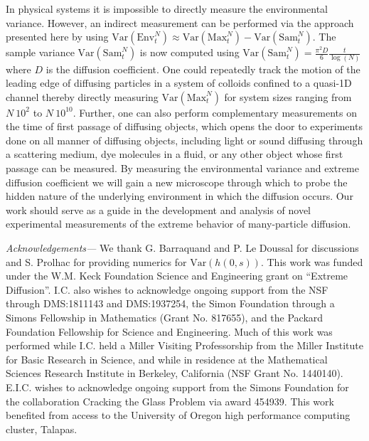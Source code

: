 \documentclass[%
 reprint,
 amsmath,amssymb,
 longbibliography,
 aps,
prl
]{revtex4-1}
\newcommand{\var}[1]{\mathrm{Var}\left(#1\right)}
\def\maxnt{\mathrm{Max}^{N}_t}
\def\envnt{\mathrm{Env}^{N}_t}
\def\snt{\mathrm{Sam}^{N}_t}
\begin{document}
In physical systems it is impossible to directly measure the environmental variance. However, an indirect measurement can be performed via the approach presented here by using $\var \envnt\approx \var \maxnt - \var \snt$. The sample variance $\var \snt$ is now computed using
$
 \var \snt = \frac{\pi^2 D}{6} \frac{t}{\log(N)}
$
where $D$ is the diffusion coefficient. One could repeatedly track the motion of the leading edge of diffusing particles in a system of colloids confined to a quasi-1D channel thereby directly measuring $\var \maxnt$ for system sizes ranging from $N ~ 10^2$ to $N ~ 10^{10}$. Further, one can also perform complementary measurements on the time of first passage of diffusing objects, which opens the door to experiments done on all manner of diffusing objects, including light or sound diffusing through a scattering medium, dye molecules in a fluid, or any other object whose first passage can be measured.
By measuring the environmental variance and extreme diffusion coefficient we will gain a new microscope through which to probe the hidden nature of the underlying environment in which the diffusion occurs. Our work should serve as a guide in the development and analysis of novel experimental measurements of the extreme behavior of many-particle diffusion.

\medskip\noindent\emph{Acknowledgements---}
We thank G. Barraquand and P. Le Doussal for discussions and S. Prolhac for providing numerics for $\var{h(0,s)}$.
This work was funded under the W.M. Keck Foundation Science and Engineering grant on ``Extreme Diffusion''.
I.C. also wishes to acknowledge ongoing support from the NSF through DMS:1811143 and DMS:1937254, the Simon Foundation through a Simons Fellowship in Mathematics (Grant No. 817655), and the Packard Foundation Fellowship for Science and Engineering. Much of this work was performed while I.C. held a Miller Visiting Professorship from the Miller Institute for Basic Research in Science, and while in residence at the Mathematical Sciences Research Institute in Berkeley, California (NSF Grant No. 1440140).
E.I.C. wishes to acknowledge ongoing support from the Simons Foundation for the collaboration Cracking the Glass Problem via award 454939. This work benefited from access to the University of Oregon high performance computing cluster, Talapas.



\end{document}
